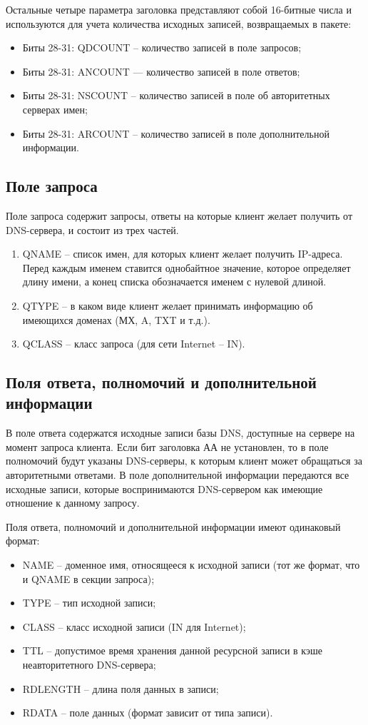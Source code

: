 Остальные четыре параметра заголовка представляют собой 16-битные числа и используются для учета количества исходных записей, возвращаемых в пакете:
\begin{itemize}
	\item Биты 28-31: QDCOUNT -- количество записей в поле запросов;
	\item Биты 28-31: ANCOUNT — количество записей в поле ответов;
	\item Биты 28-31: NSCOUNT -- количество записей в поле об авторитетных серверах имен;
	\item Биты 28-31: ARCOUNT -- количество записей в поле дополнительной информации.
\end{itemize}

 
\subsection{Поле запроса}
Поле запроса содержит запросы, ответы на которые клиент желает получить от DNS-сервера, и состоит из трех частей.

\begin{enumerate}
	\item QNAME -- список имен, для которых клиент желает получить IP-адреса. Перед каждым именем ставится однобайтное значение, которое определяет длину имени, а конец списка обозначается именем с нулевой длиной.
	\item QTYPE -- в каком виде клиент желает принимать информацию об имеющихся доменах (МХ, A, TXT и т.д.).
	\item QCLASS -- класс запроса (для сети Internet -- IN).
\end{enumerate}


\subsection{Поля ответа, полномочий и дополнительной информации}

В поле ответа содержатся исходные записи базы DNS, доступные на сервере на момент запроса клиента. Если бит заголовка АА не установлен, то в поле полномочий будут указаны DNS-серверы, к которым клиент может обращаться за авторитетными ответами. В поле дополнительной информации передаются все исходные записи, которые воспринимаются DNS-сервером как имеющие отношение к данному запросу.

Поля ответа, полномочий и дополнительной информации имеют одинаковый формат:
\begin{itemize}
	\item NAME -- доменное имя, относящееся к исходной записи (тот же формат, что и QNAME в секции запроса);
	\item TYPE -- тип исходной записи;
	\item CLASS	-- класс исходной записи (IN для Internet);
	\item TTL -- допустимое время хранения данной ресурсной записи 
	в кэше неавторитетного DNS-сервера;
	\item RDLENGTH -- длина поля данных в записи;
	\item RDATA	-- поле данных (формат зависит от типа записи).
\end{itemize}



